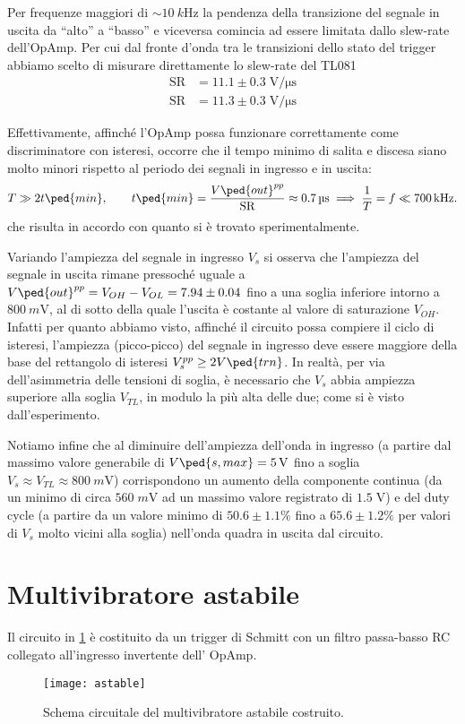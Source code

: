 \documentclass[10pt, a4paper, italian]{article}
\begin{document}
Per frequenze maggiori di $\sim \SI{10}{k\Hz}$ la pendenza della transizione
del segnale in uscita da ``alto'' a ``basso'' e viceversa comincia ad essere
limitata dallo slew-rate dell'OpAmp.
Per cui dal fronte d'onda tra le transizioni dello stato del trigger abbiamo
scelto di misurare direttamente lo slew-rate del TL081
\begin{align*}
\mathrm{SR} &= 11.1 \pm 0.3 \; \si{\V/\micro\s} \\
\mathrm{SR} &= 11.3 \pm 0.3 \; \si{\V/\micro\s}
\end{align*}

Effettivamente, affinché l'OpAmp possa funzionare correttamente come
discriminatore con isteresi, occorre che il tempo minimo di salita e discesa
siano molto minori rispetto al periodo dei segnali in ingresso e in uscita:
\begin{equation}\label{eq: slewlim}
T \gg 2 t\ped{min}, \qquad t\ped{min} =
\frac{V\ped{out}^{pp}}{\mathrm{SR}} \approx \SI{0.7}{\micro\s}
\implies \frac{1}{T} = f \ll \SI{700}{k\Hz}.
\end{equation}
che risulta in accordo con quanto si è trovato sperimentalmente.

Variando l'ampiezza del segnale in ingresso $V_s$ si osserva che l'ampiezza del
segnale in uscita rimane pressoché uguale a $V\ped{out}^{pp} = V_{OH} - V_{OL}
= 7.94 \pm 0.04$ fino a una soglia inferiore intorno a $\SI{800}{m\V}$, al di
sotto della quale l'uscita è costante al valore di saturazione $V_{OH}$.
Infatti per quanto abbiamo visto, affinché il circuito possa compiere il ciclo
di isteresi, l'ampiezza (picco-picco) del segnale in ingresso deve essere
maggiore della base del rettangolo di isteresi $V_s^{pp} \geq 2 V\ped{trn}$.
In realtà, per via dell'asimmetria delle tensioni di soglia, è necessario
che $V_s$ abbia ampiezza superiore alla soglia $V_{TL}$, in modulo la
più alta delle due; come si è visto dall'esperimento.

Notiamo infine che al diminuire dell'ampiezza dell'onda in ingresso (a partire
dal massimo valore generabile di $V\ped{s, max} = \SI{5}{\V}$ fino a soglia
$V_s \approx V_{TL} \approx \SI{800}{m\V}$)
corrispondono un aumento della componente continua (da un minimo di circa
$560 \; \si{m\V}$ ad un massimo valore registrato di $1.5 \; \si{\V}$) e del
duty cycle (a partire da un valore minimo di $50.6 \pm 1.1 \%$ fino a
$65.6 \pm 1.2 \%$ per valori di $V_s$ molto vicini alla soglia) nell'onda
quadra in uscita dal circuito.

\section{Multivibratore astabile}
Il circuito in \cref{fig: astableschm} è costituito da un trigger di
Schmitt con un filtro passa-basso RC collegato all'ingresso invertente dell'
OpAmp.
\begin{figure}[htbp]
    \centering
	\texttt{[image: astable]}
    \caption{Schema circuitale del multivibratore astabile costruito.
    \label{fig: astableschm}}
\end{figure}
\end{document}
